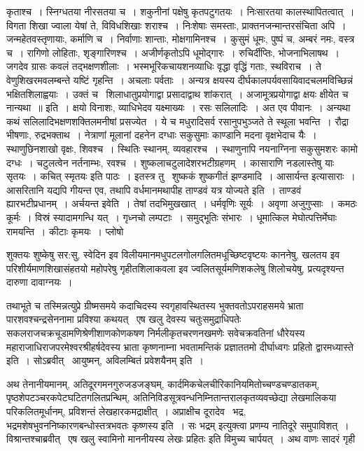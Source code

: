 \documentclass[11pt, openany]{book}
\begin{document}
\noindent
{\s कृताश्च~। स्निग्धतया नीरसतया च~। शकुनीनां पक्षेषु कृतपटुगतयः~। निःसारतया कालस्थापितत्वात्~। विगता शिखा ज्वाला येषां ते, विविधशिखाः शराश्च~। निःशेषाः समस्ताः, प्राक्तनजन्मान्तरसंचिता अपि~। जन्महेतवस्तृणायाः, कर्माणि च~। निर्वाणाः शान्ताः, मोक्षगामिनश्च~। कुसुमं धूमः, पुष्पं च, अम्बरं नमः, वस्त्र च~। रागिणो लोहिताः, शृङ्गारिणश्च~। अजीर्णकृतोऽपि धूमोद्गारः~। रुचिर्दीप्तिः, भोजनाभिलाषथ~। जगदेव ग्रासः कवलं तद्भक्षणशीलाः~। भस्मभूरिकचायशनव्याधिः वृद्धा वृद्धिं गताः, स्थविराच~। ते वेणुशिखरमवलम्बन्ते यष्टिं गृहन्ति~। अचलाः पर्वताः~। अन्यत्र क्षयस्य दीर्घकालपर्यवसायिवादचलमविच्छिन्नं भक्षितशिलाह्वयाः~। उक्तं च \textendash\ {\qt शिलाधातुप्रयोगाद्वा प्रसादाद्वाथ शांकरात्~। अजामूत्रप्रयोगाद्वा क्षयः क्षीयेत च नान्यथा~॥} इति~। क्षयो विनाशः, व्याधिभेदव यक्ष्माख्यः~। रसः सलिलादिः~। अत एव पीवानः~। अन्यथा कथं सलिलादिभक्षणशक्तिलमनीषां प्रसज्येत~। ये च मधुरादिसर्व रसानुपभुञ्जते ते स्थूला भवन्ति~। रौद्रा भीषणाः, रुद्रभक्ताथ~। नेत्राणां मूलानां दहनेन दग्धाः सकुसुमाः काण्डानि मदना वृक्षभेदाच यैः~। स्थाणुछिनशाखो वृक्षः, शिवश्च~। स्थितिः स्थानम्, व्यवहारश्च~। स्थाणुनापि नयनाग्निना सकुसुमशरः कामो दग्धः~। चटुलत्वेन नर्तनाम्भः, रवश्च~। शुष्कलाचटुलादेशरभटीग्रहणम्~। कासाराणि नडलास्तेषु याः सृतयः~। कचित् {\qt स्मृतयः} इति पाठः~। इतस्त्र तु \textendash\ शुष्ककं शुष्कगीतं झण्डमादि~। {\qtt आसार्यन्त इत्यासाराः}~। आसरितानि यद्यपि गीयन्त एव, तथापि {\qt वर्धमानमथापीह ताण्डवं यत्र योज्यते} इति~। ताण्डवं ह्यारभटीप्रधानम्~। अर्चयन्त इवेति~। तेषां तदभिमुखखात्~। धर्मवृणिः सूर्यः~। अवृणा अजुगुप्साः~। कमठः कूर्मः~। {\qt विस्रं स्यादामगन्धि यत्}~। गृध्नचो लम्पटाः~। समुद्भूतिः संभारः~। धूमात्किल मेघोत्पत्तिर्मेघाः रामयन्ति~। कीटाः कृमयः~। प्लोषो}

\newpage

\noindent
शुक्तयः शुष्केषु सर:सु, स्वेदिन इव विलीयमानमधुपटलगोलगलितमधूच्छिष्टवृष्टयः काननेषु, खलतय इव परिशीर्यमाणशिखासंहतयो महोपरेषु गृहीतशिलाकवला इव ज्वलितसूर्यमणिशकलेषु शिलोचयेषु, प्रत्यदृश्यन्त दारुणा दावाग्नयः~।

तथाभूते च तस्मिन्नत्युप्रे ग्रीष्मसमये कदाचिदस्य स्वगृहावस्थितस्य भुक्तवतोऽपराहसमये भ्राता पारशवश्चन्द्रसेननामा प्रविश्या कथयत् \textendash\ एष खलु देवस्य चतुःसमुद्राधिपतेः सकलराजचक्रचूडामणिश्रेणीशाणकोणकषण निर्मलीकृतचरणनखमणेः सवेचक्रवतिनां धौरेयस्य महाराजाधिराजपरमेश्वरश्रीहर्षदेवस्य भ्राता कृष्णनाम्ना भवतामन्तिकं प्रज्ञाततमो दीर्घाध्वगः प्रहितो द्वारमध्यास्ते इति~। सोऽब्रवीत् \textendash\ {\haq आयुष्मन्, अविलम्बितं प्रवेशयैनम्} इति~।

अथ तेनानीयमानम्, अतिदूरगमनगुरुजडजङ्घम्, कार्दमिकचेलचीरिकानियमितोच्चण्डचण्डातकम्, पृष्ठशेपटञ्चरकपेटघटितगलितप्रन्थिम्, अतिनिविडसूत्रवन्धनिम्नितान्तरालकृतव्यवच्छेद्या लेखमालिकया परिकलितमूर्धानम्, प्रविशन्तं लेखहारकमद्राक्षीत्~। अप्राक्षीच दूरादेव \textendash\ {\haq भद्र, भद्रमशेषभुवननिष्कारणबन्धोस्तत्रभवतः कृष्णस्य} इति~। सः {\haq भद्रम्} इत्युक्त्वा प्रणम्य नातिदूरे समुपाविशत्~। विश्रान्तश्चाब्रवीत् \textendash\ {\haq एष खलु स्वामिनो माननीयस्य लेखः प्रहितः} इति विमुच्य चार्पयत्~। अथ वाणः सादरं गृही\textendash
\end{document}
